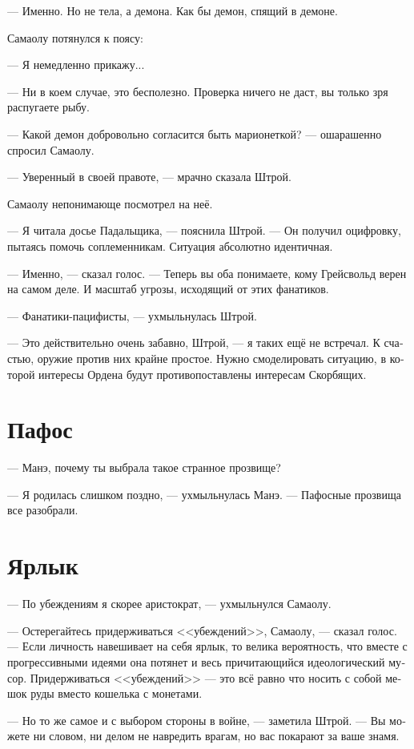 \documentclass[a4paper,12pt,fleqn]{book}\usepackage{cooltooltips}\usepackage{polyglossia}\setdefaultlanguage[babelshorthands=true]{russian}\setotherlanguage{english}\defaultfontfeatures{Ligatures=TeX,Mapping=tex-text} \usepackage{xcolor}\definecolor{lightgray}{HTML}{bbbbbb}\color{lightgray}\newcommand{\ml}[3]{\textenglish{\textcolor{black}{#3}}}
\begin{document}
{--- Именно.
Но не тела, а демона.
Как бы демон, спящий в демоне.

Самаолу потянулся к поясу:

--- Я немедленно прикажу...

--- Ни в коем случае, это бесполезно.
Проверка ничего не даст, вы только зря распугаете рыбу.

--- Какой демон добровольно согласится быть марионеткой? --- ошарашенно спросил Самаолу.

--- Уверенный в своей правоте, --- мрачно сказала Штрой.

Самаолу непонимающе посмотрел на неё.

--- Я читала досье Падальщика, --- пояснила Штрой.
--- Он получил оцифровку, пытаясь помочь соплеменникам.
Ситуация абсолютно идентичная.

--- Именно, --- сказал голос.
--- Теперь вы оба понимаете, кому Грейсвольд верен на самом деле.
И масштаб угрозы, исходящий от этих фанатиков.

--- Фанатики-пацифисты, --- ухмыльнулась Штрой.

--- Это действительно очень забавно, Штрой, --- я таких ещё не встречал.
К счастью, оружие против них крайне простое.
Нужно смоделировать ситуацию, в которой интересы Ордена будут противопоставлены интересам Скорбящих.

\section{Пафос}

--- Манэ, почему ты выбрала такое странное прозвище?

--- Я родилась слишком поздно, --- ухмыльнулась Манэ.
--- Пафосные прозвища все разобрали.

\section{Ярлык}

--- По убеждениям я скорее аристократ, --- ухмыльнулся Самаолу.

--- Остерегайтесь придерживаться <<убеждений>>, Самаолу, --- сказал голос.
--- Если личность навешивает на себя ярлык, то велика вероятность, что вместе с прогрессивными идеями она потянет и весь причитающийся идеологический мусор.
Придерживаться <<убеждений>> --- это всё равно что носить с собой мешок руды вместо кошелька с монетами.

--- Но то же самое и с выбором стороны в войне, --- заметила Штрой.
--- Вы можете ни словом, ни делом не навредить врагам, но вас покарают за ваше знамя.

}
\end{document}
